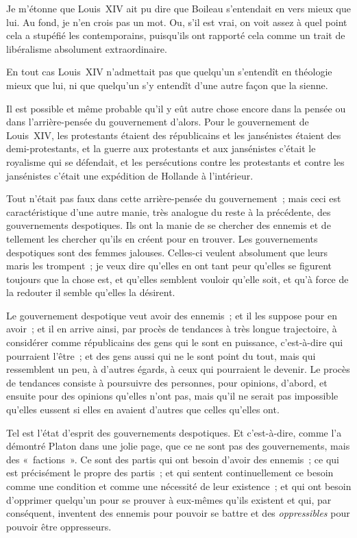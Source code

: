 \documentclass[french,twoside]{book} %
\begin{document}
Je m’étonne que Louis XIV ait pu dire que Boileau s’entendait en vers mieux que lui. Au fond, je n’en crois pas un mot. Ou, s’il est vrai, on voit assez à quel point cela a stupéfié les contemporains, puisqu’ils ont rapporté cela comme un trait de libéralisme absolument extraordinaire.\par
En tout cas Louis XIV n’admettait pas que quelqu’un  s’entendît en théologie mieux que lui, ni que quelqu’un s’y entendît d’une autre façon que la sienne.\par
Il est possible et même probable qu’il y eût autre chose encore dans la pensée ou dans l’arrière-pensée du gouvernement d’alors. Pour le gouvernement de Louis XIV, les protestants étaient des républicains et les jansénistes étaient des demi-protestants, et la guerre aux protestants et aux jansénistes c’était le royalisme qui se défendait, et les persécutions contre les protestants et contre les jansénistes c’était une expédition de Hollande à l’intérieur.\par
Tout n’était pas faux dans cette arrière-pensée du gouvernement ; mais ceci est caractéristique d’une autre manie, très analogue du reste à la précédente, des gouvernements despotiques. Ils ont la manie de se chercher des ennemis et de tellement les chercher qu’ils en créent pour en trouver. Les gouvernements despotiques sont des femmes jalouses. Celles-ci veulent absolument que leurs maris les trompent ; je veux dire qu’elles en ont tant peur qu’elles se figurent toujours que la chose est, et qu’elles semblent vouloir qu’elle soit, et qu’à force de la redouter il semble qu’elles la désirent.\par
Le gouvernement despotique veut avoir des  ennemis ; et il les suppose pour en avoir ; et il en arrive ainsi, par procès de tendances à très longue trajectoire, à considérer comme républicains des gens qui le sont en puissance, c’est-à-dire qui pourraient l’être ; et des gens aussi qui ne le sont point du tout, mais qui ressemblent un peu, à d’autres égards, à ceux qui pourraient le devenir. Le procès de tendances consiste à poursuivre des personnes, pour opinions, d’abord, et ensuite pour des opinions qu’elles n’ont pas, mais qu’il ne serait pas impossible qu’elles eussent si elles en avaient d’autres que celles qu’elles ont.\par
Tel est l’état d’esprit des gouvernements despotiques. Et c’est-à-dire, comme l’a démontré Platon dans une jolie page, que ce ne sont pas des gouvernements, mais des « factions ». Ce sont des partis qui ont besoin d’avoir des ennemis ; ce qui est précisément le propre des partis ; et qui sentent continuellement ce besoin comme une condition et comme une nécessité de leur existence ; et qui ont besoin d’opprimer quelqu’un pour se prouver à eux-mêmes qu’ils existent et qui, par conséquent, inventent des ennemis pour pouvoir se battre et des {\itshape oppressibles} pour pouvoir être oppresseurs.\par
\end{document}

